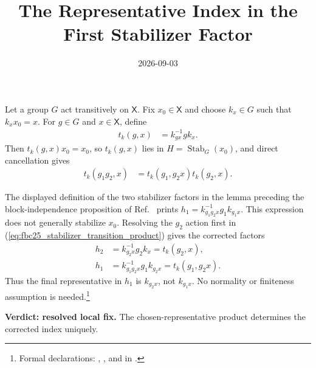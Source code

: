 \documentclass{article}
\title{The Representative Index in the First Stabilizer Factor}
\author{}
\date{2026-09-03}
\begin{document}
\maketitle
{}

Let a group $G$ act transitively on $\mathsf X$. Fix $x_0\in\mathsf X$ and
choose $k_x\in G$ such that $k_xx_0=x$. For $g\in G$ and $x\in\mathsf X$,
define
\begin{align}
    t_k(g,x)
        &=k_{g x}^{-1}gk_x.
    \label{eq:fbc25_stabilizer_transition}
\end{align}
Then $t_k(g,x)x_0=x_0$, so $t_k(g,x)$ lies in
$H=\operatorname{Stab}_G(x_0)$, and direct cancellation gives
\begin{align}
    t_k(g_1g_2,x)
        &=t_k(g_1,g_2x)t_k(g_2,x).
    \label{eq:fbc25_stabilizer_transition_product}
\end{align}

The displayed definition of the two stabilizer factors in the lemma preceding
the block-independence proposition of
Ref.~\cite{FrancoRubio2025MPUGauging} prints
$h_1=k_{g_1g_2x}^{-1}g_1k_{g_1x}$. This expression does not generally
stabilize $x_0$. Resolving the $g_2$ action first in
(\ref{eq:fbc25_stabilizer_transition_product}) gives the corrected factors
\begin{align}
    h_2
        &=k_{g_2x}^{-1}g_2k_x=t_k(g_2,x),
    \label{eq:fbc25_stabilizer_h2}\\
    h_1
        &=k_{g_1g_2x}^{-1}g_1k_{g_2x}=t_k(g_1,g_2x).
    \label{eq:fbc25_stabilizer_h1}
\end{align}
Thus the final representative in $h_1$ is $k_{g_2x}$, not $k_{g_1x}$.
No normality or finiteness assumption is needed.\footnote{Formal declarations:
,
, and
 in
.}

\textbf{Verdict: resolved local fix.}
The chosen-representative product determines the corrected index uniquely.



\end{document}
